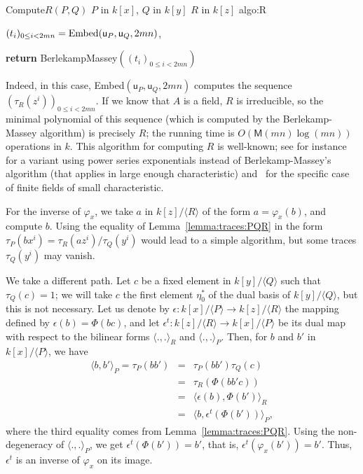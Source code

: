 \documentclass{sig-alternate}
\def\M {\ensuremath{\mathsf{M}}}
\def\vu {\ensuremath{\mathsf{u}}}
\newcounter{algo}
\newenvironment{algorithm_endline}[4]{\small\begin{center}\begin{minipage}{0.48\textwidth}
      \refstepcounter{algo}
      \label{#4}
      \sf
      \rule{\textwidth}{0.2pt}\\
      \makebox[\textwidth][c]{Algorithm~\arabic{algo}:~\textbf{#1}}\\
      \rule[0.5\baselineskip]{\textwidth}{0.2pt}\\

      \vspace{-12pt}

      \parbox{\textwidth}{\textbf{Input} #2}
      \parbox{\textwidth}{\textbf{Output} #3}

\vspace{-7pt}

      \begin{enumerate*}}{\end{enumerate*}
      \vspace{-11pt}
      \rule{\textwidth}{0.2pt}
\end{minipage}\end{center}
}
\newcommand{\ang}[1]{\langle#1\rangle}
\begin{document}
\begin{algorithm_endline}
{Compute$R(P,Q)$}
{$P$ in $k[x]$, $Q$ in $k[y]$}
{$R$ in $k[z]$}
{algo:R}
\item $(t_i)_{0 \le i < 2mn}={\rm Embed}(\vu_P,\vu_Q,2mn)$,
\item {\bf return} BerlekampMassey$((t_i)_{0 \le i < 2mn})$
\end{algorithm_endline}

Indeed, in this case, Embed$(\vu_P,\vu_Q,2mn)$ computes the sequence
$(\tau_R(z^i))_{0\le i < 2mn}$. If we know that $A$ is a field, $R$ is
irreducible, so the minimal polynomial of this sequence (which is
computed by the Berlekamp-Massey algorithm) is precisely $R$; the
running time is $O(\M(mn)\log(mn))$ operations in $k$. This algorithm
for computing $R$ is well-known; see for instance~\cite{BoFlSaSc06}
for a variant using power series exponentials instead of
Berlekamp-Massey's algorithm (that applies in large enough
characteristic) and~\cite{BGPS05} for the specific case of finite
fields of small characteristic.


For the inverse of $\varphi_x$, we take $a$ in $k[z]/\langle R
\rangle$ of the form $a=\varphi_x(b)$, and compute $b$. Using the
equality of Lemma~\ref{lemma:traces:PQR} in the form $\tau_P(b x^i)
=\tau_R(a z^i)/\tau_Q(y^i)$ would lead to a simple algorithm, but some
traces $\tau_Q(y^i)$ may vanish. 

We take a different path. Let $c$ be a fixed element in $k[y]/\ang{Q}$
such that $\tau_Q(c)=1$; we will take $c$ the first element
$\eta^\ast_0$ of the dual basis of $k[y]/\ang{Q}$, but this is not
necessary. Let us denote by $\epsilon: k[x]/\ang{P} \to k[z]/\ang{R}$
the mapping defined by $\epsilon(b) = \Phi(b c)$, and let $\epsilon^t:
k[z]/\ang{R} \to k[x]/\ang{P}$ be its dual map with respect to the
bilinear forms $\ang{.,.}_R$ and $\ang{.,.}_P$. Then, for $b$ and $b'$
in $k[x]/\ang{P}$, we have
\begin{eqnarray*}
\ang{b,b'}_P = \tau_P(b b') &=&  \tau_P(b b')\tau_Q(c) \\
&=& \tau_R( \Phi(b b' c))\\
&=& \ang{\epsilon(b), \Phi(b')}_R \\
&=& \ang{b, \epsilon^t(\Phi(b'))}_P,
\end{eqnarray*}
where the third equality comes from
Lemma~\ref{lemma:traces:PQR}. Using the non-degeneracy of
$\ang{.,.}_P$, we get $\epsilon^t(\Phi(b')) = b'$, that is,
$\epsilon^t(\varphi_x(b')) = b'$. Thus, $\epsilon^t$ is an inverse of
$\varphi_x$ on its image.
\end{document}
